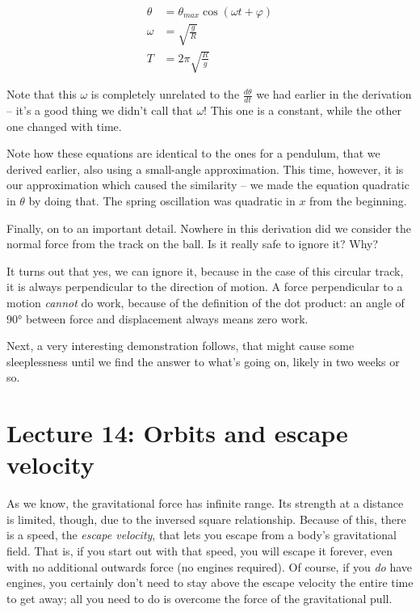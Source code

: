 \documentclass[12pt,a4paper]{report}
\begin{document}
\begin{align}
\theta &= \theta_{max} \cos (\omega t + \varphi)\\
\omega &= \sqrt{\frac{g}{R}}\\
T      &= 2 \pi \sqrt{\frac{R}{g}}
\end{align}

Note that this $\omega$ is completely unrelated to the $\displaystyle \frac{d\theta}{dt}$ we had earlier in the derivation -- it's a good thing we didn't call that $\omega$! This one is a constant, while the other one changed with time.

Note how these equations are identical to the ones for a pendulum, that we derived earlier, also using a small-angle approximation. This time, however, it is our approximation which caused the similarity -- we made the equation quadratic in $\theta$ by doing that. The spring oscillation was quadratic in $x$ from the beginning.

Finally, on to an important detail. Nowhere in this derivation did we consider the normal force from the track on the ball. Is it really safe to ignore it? Why?

It turns out that yes, we can ignore it, because in the case of this circular track, it is always perpendicular to the direction of motion. A force perpendicular to a motion \emph{cannot} do work, because of the definition of the dot product: an angle of $\ang{90}$ between force and displacement always means zero work.

Next, a very interesting demonstration follows, that might cause some sleeplessness until we find the answer to what's going on, likely in two weeks or so.

\section{Lecture 14: Orbits and escape velocity}

As we know, the gravitational force has infinite range. Its strength at a distance is limited, though, due to the inversed square relationship. Because of this, there is a speed, the \emph{escape velocity}, that lets you escape from a body's gravitational field. That is, if you start out with that speed, you will escape it forever, even with no additional outwards force (no engines required). Of course, if you \emph{do} have engines, you certainly don't need to stay above the escape velocity the entire time to get away; all you need to do is overcome the force of the gravitational pull.
\end{document}
